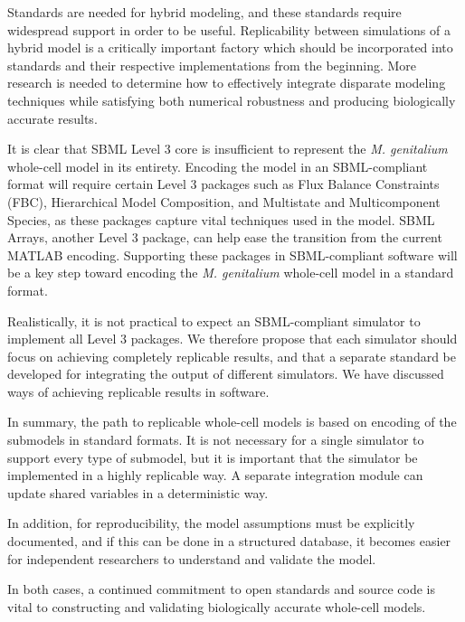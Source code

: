\documentclass[journal,transmag,twoside]{IEEEtran}
\begin{document}
Standards are needed for hybrid modeling, and these standards require widespread
support in order to be useful.
Replicability between simulations of a hybrid model is a critically important
factory which should be incorporated into standards and their respective
implementations from the beginning.
More research is needed to determine how to effectively integrate disparate
modeling techniques while satisfying both numerical robustness and producing
biologically accurate results.

It is clear that SBML Level 3 core is insufficient to represent the
\textit{M. genitalium} whole-cell model in its entirety.
Encoding the model in an SBML-compliant format will require
certain Level 3 packages such as Flux Balance Constraints (FBC),
Hierarchical Model Composition, and Multistate and Multicomponent Species,
as these packages capture vital techniques used in the model.
SBML Arrays, another Level 3 package, can help ease the transition
from the current MATLAB \cite{MATLAB:2010} encoding.
Supporting these packages in SBML-compliant software will be a key
step toward encoding the \textit{M. genitalium} whole-cell model in a standard format.

Realistically, it is not practical to expect an SBML-compliant simulator
to implement all Level 3 packages. We therefore propose that
each simulator should focus on achieving completely replicable results,
and that a separate standard be developed for integrating the
output of different simulators.
We have discussed ways of achieving replicable results in software.

In summary, the path to replicable whole-cell models is based on
encoding of the submodels in standard formats. It is not necessary for a single simulator
to support every type of submodel, but it is important that the simulator
be implemented in a highly replicable way.
A separate integration module can update shared variables in a deterministic way.

In addition, for reproducibility, the model assumptions must be explicitly
documented, and if this can be done in a structured database,
it becomes easier for independent researchers to understand and validate the model.

In both cases, a continued commitment to open standards and source code is vital
to constructing and validating biologically accurate whole-cell models.

\end{document}
